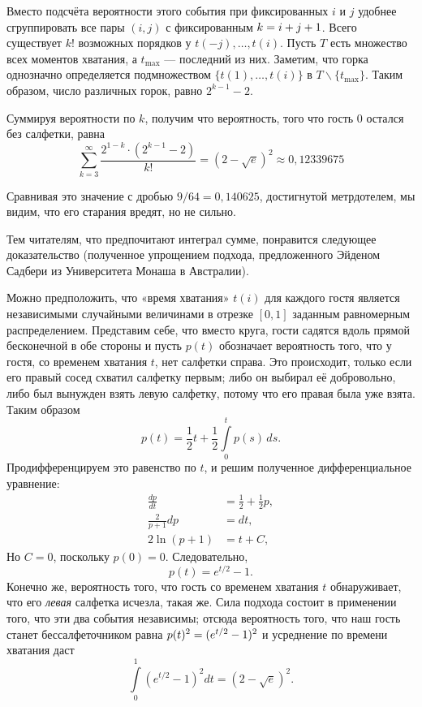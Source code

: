 Вместо подсчёта вероятности этого события при фиксированных $i$ и $j$ удобнее сгруппировать все пары $(i, j)$ с фиксированным $k=i\z+j+1$.
Всего существует $k!$ возможных порядков у $t(- j),\dots, t (i)$.
Пусть $T$ есть множество всех моментов хватания, а $t_{{\max}}$ --- последний из них. 
Заметим, что горка однозначно определяется подмножеством $\{t(1),\dots,t(i)\}$ в $T\backslash \{t_{{\max}}\}$.
Таким образом, число различных горок, равно $2^{k-1}-2$.

Суммируя вероятности по $k$, получим что вероятность, того что гость 0 остался без салфетки, равна
\[\sum_{k=3}^\infty\frac{2^{1-k}\cdot(2^{k-1}-2)}{k!}=(2-\sqrt{e})^2\approx 0{,}12339675\]
\heart

Сравнивая это значение с дробью $9/64 = 0{,}140625$, достигнутой метрдотелем, мы видим, что его старания вредят, но не сильно.

\medskip

Тем читателям, что предпочитают интеграл сумме, понравится следующее доказательство (полученное упрощением подхода, предложенного Эйденом Садбери из Университета Монаша в Австралии).

Можно предположить, что «время хватания» $t(i)$ для каждого гостя является независимыми случайными величинами в отрезке $[0,1]$ заданным равномерным распределением.
Представим себе, что вместо круга, гости садятся вдоль прямой бесконечной в обе стороны и пусть $p(t)$ обозначает вероятность того, что у гостя, со временем хватания $t$, нет салфетки справа.
Это происходит, только если его правый сосед схватил салфетку первым;
либо он выбирал её добровольно,
либо был вынужден взять левую салфетку, потому что его правая была уже взята.
Таким образом
\[p(t)=\frac12t+\frac12\int\limits_0^tp(s)\,ds.\]
Продифференцируем это равенство по $t$, и решим полученное дифференциальное уравнение:
\begin{align*}
\frac{dp}{dt}&=\frac12+\frac12p,
\\
\frac2{p+1}dp&=dt,
\\
2\ln(p+1)&=t+C,
\end{align*}
Но $C=0$, поскольку $p(0)=0$.
Следовательно,
\[p(t) = e^{t/2} - 1.\]
Конечно же, вероятность того, что гость со временем хватания $t$ обнаруживает, что его \emph{левая} салфетка исчезла, такая же.
Сила подхода состоит в применении того, что эти два события независимы;
отсюда вероятность того, что наш гость станет бессалфеточником равна $p(t)^2 \z= (e^{t/2} -1)^2$ и усреднение по времени хватания даст
\[\int\limits_0^1(e^{t/2}-1)^2dt=(2-\sqrt{e})^2.\]
\heart


